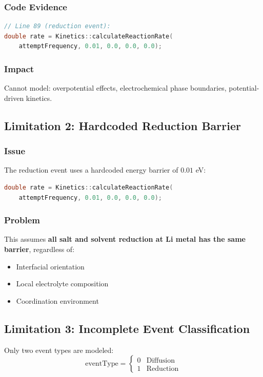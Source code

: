 \documentclass[11pt,a4paper]{article}
\begin{document}
\subsubsection{Code Evidence}
\begin{lstlisting}[language=C++, breaklines=true]
// Line 89 (reduction event):
double rate = Kinetics::calculateReactionRate(
    attemptFrequency, 0.01, 0.0, 0.0, 0.0);
\end{lstlisting}

\subsubsection{Impact}
Cannot model: overpotential effects, electrochemical phase boundaries, potential-driven kinetics.

\subsection{Limitation 2: Hardcoded Reduction Barrier}

\subsubsection{Issue}
The reduction event uses a hardcoded energy barrier of $0.01$ eV:

\begin{lstlisting}[language=C++, breaklines=true]
double rate = Kinetics::calculateReactionRate(
    attemptFrequency, 0.01, 0.0, 0.0, 0.0);
\end{lstlisting}

\subsubsection{Problem}
This assumes \textbf{all salt and solvent reduction at Li metal has the same barrier}, regardless of:
\begin{itemize}
    \item Interfacial orientation
    \item Local electrolyte composition
    \item Coordination environment
\end{itemize}

\subsection{Limitation 3: Incomplete Event Classification}

Only two event types are modeled:
\begin{equation}
\text{eventType} = \begin{cases} 
0 & \text{Diffusion} \\
1 & \text{Reduction}
\end{cases}
\end{equation}
\end{document}

